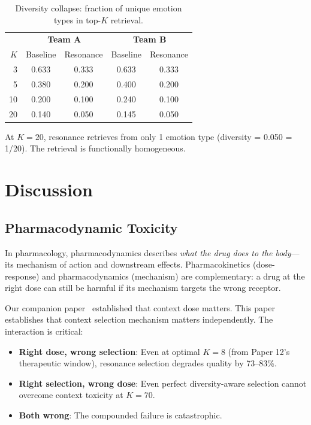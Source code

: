 \documentclass[11pt,a4paper]{article}
\begin{document}
\begin{table}[h]
\centering
\caption{Diversity collapse: fraction of unique emotion types in top-$K$ retrieval.}
\label{tab:diversity}
\small
\begin{tabular}{@{}r|cc|cc@{}}
\toprule
& \multicolumn{2}{c|}{\textbf{Team A}} & \multicolumn{2}{c}{\textbf{Team B}} \\
$K$ & Baseline & Resonance & Baseline & Resonance \\
\midrule
3  & 0.633 & 0.333 & 0.633 & 0.333 \\
5  & 0.380 & 0.200 & 0.400 & 0.200 \\
10 & 0.200 & 0.100 & 0.240 & 0.100 \\
20 & 0.140 & 0.050 & 0.145 & 0.050 \\
\bottomrule
\end{tabular}
\end{table}

At $K{=}20$, resonance retrieves from only 1 emotion type (diversity = 0.050 = 1/20). The retrieval is functionally homogeneous.

\section{Discussion}

\subsection{Pharmacodynamic Toxicity}

In pharmacology, pharmacodynamics describes \emph{what the drug does to the body}---its mechanism of action and downstream effects. Pharmacokinetics (dose-response) and pharmacodynamics (mechanism) are complementary: a drug at the right dose can still be harmful if its mechanism targets the wrong receptor.

Our companion paper~\citep{jo2026pharmacokinetics} established that context dose matters. This paper establishes that context selection mechanism matters independently. The interaction is critical:

\begin{itemize}[itemsep=2pt]
  \item \textbf{Right dose, wrong selection}: Even at optimal $K{=}8$ (from Paper 12's therapeutic window), resonance selection degrades quality by 73--83\%.
  \item \textbf{Right selection, wrong dose}: Even perfect diversity-aware selection cannot overcome context toxicity at $K{=}70$.
  \item \textbf{Both wrong}: The compounded failure is catastrophic.
\end{itemize}
\end{document}
